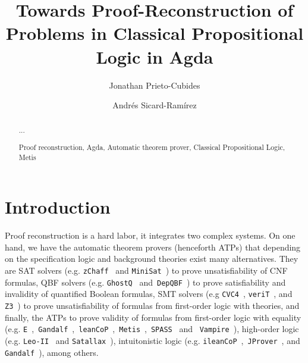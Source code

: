 \documentclass[runningheads,a4paper]{llncs}
\newcommand{\keywords}[1]{\par\addvspace\baselineskip
\noindent\keywordname\enspace\ignorespaces#1}
\begin{document}
\mainmatter  %

\title{Towards Proof-Reconstruction of Problems in Classical Propositional Logic
in Agda}


\author{Jonathan Prieto-Cubides%
\and Andr\'es Sicard-Ram\'irez}
%


\maketitle


\begin{abstract}
...
\keywords{Proof reconstruction, Agda, Automatic theorem prover, Classical Propositional Logic, Metis }
\end{abstract}

\section{Introduction}
Proof reconstruction is a hard labor, it integrates two
complex systems. On one hand, we have the automatic theorem provers (henceforth
ATPs) that depending on the specification logic and background theories exist
many alternatives. They are SAT solvers (e.g. \verb!zChaff!~\cite{Moskewicz2001} and \verb!MiniSat!~\cite{Een2004}) to prove unsatisfiability of CNF formulas,
QBF solvers (e.g. \verb!GhostQ!~\cite{Klieber2014} and~\verb!DepQBF!~\cite{Lonsing2017}) to prove satisfiability and invalidity of quantified Boolean
formulas, SMT solvers (e.g \verb!CVC4!~\cite{Barrett2011}, \verb!veriT!~\cite{bouton2009}, and \verb!Z3!~\cite{DeMoura2008}) to
prove unsatisfiability of formulas from first-order logic with theories,  and
finally, the ATPs to prove validity of formulas from first-order logic with
equality (e.g. \verb!E!~\cite{Schulz:AICOM-2002},~\verb!Gandalf!~\cite{Tammet1997},~\verb!leanCoP!~\cite{Otten2008},~\verb!Metis!~\cite{hurd2003first},~\verb!SPASS!~\cite{Weidenbach2009} and ~\verb!Vampire!~\cite{Riazanov1999}),
high-order logic (e.g. \verb!Leo-II!~\cite{Benzmuller2008} and \verb!Satallax!~\cite{Brown2012}), intuitonistic logic
(e.g. \verb!ileanCoP!~\cite{Otten2008},~\verb!JProver!~\cite{Schmitt2001}, and \verb!Gandalf!~\cite{Tammet1997}), among others.
\end{document}

